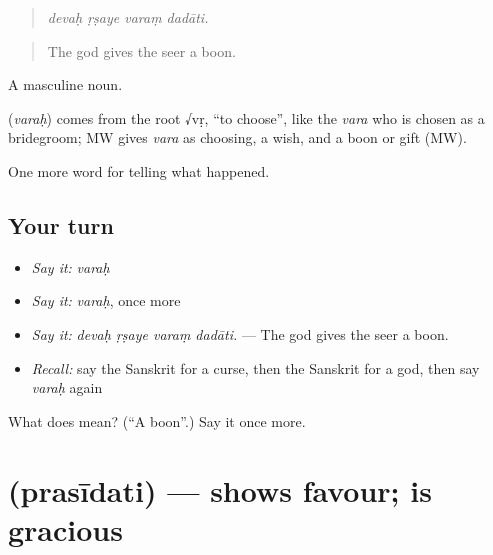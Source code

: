 \begin{quote}
   
\end{quote}

\begin{quote}
\emph{devaḥ ṛṣaye varaṃ dadāti.}
\end{quote}

\begin{quote}
The god gives the seer a boon.
\end{quote}

A masculine noun.

\begin{cousinweb}
\textbf{} (\emph{varaḥ}) comes from the root √vṛ, \textquotedblleft{}to choose\textquotedblright{}, like the \emph{vara} who is chosen as a bridegroom; MW gives \emph{vara} as choosing, a wish, and a boon or gift (MW).
\end{cousinweb}

\begin{grammarlens}[title={What you've built}]
One more word for telling what happened.
\end{grammarlens}

\subsection*{Your turn}
\begin{itemize}
\raggedright
  \item \emph{Say it:} \emph{varaḥ}
  \item \emph{Say it:} \emph{varaḥ}, once more
  \item \emph{Say it:} \emph{devaḥ ṛṣaye varaṃ dadāti.} — The god gives the seer a boon.
  \item \emph{Recall:} say the Sanskrit for a curse, then the Sanskrit for a god, then say \emph{varaḥ} again
\end{itemize}

\begin{tcolorbox}[breakable,colback=teal!4,colframe=teal!35!black,title={Before you move on}]
What does  mean? (\textquotedblleft{}A boon\textquotedblright{}.) Say it once more.
\end{tcolorbox}
\section[\texorpdfstring{\sk{प्रसीदति} (prasīdati)}{प्रसीदति (prasīdati)}]{ (prasīdati) — shows favour; is gracious}

